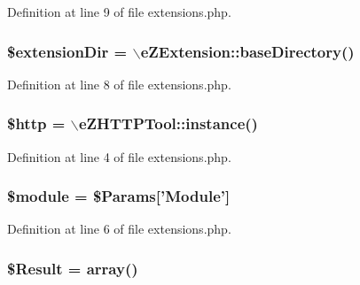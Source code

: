 Definition at line 9 of file extensions.\-php.

\hypertarget{extensions_8php_a511fe73f345235dca8dfab597f398521}{
\subsubsection[{\$extension\-Dir}]{\setlength{\rightskip}{0pt plus 5cm}\$extension\-Dir = $\backslash$e\-Z\-Extension\-::base\-Directory()}}\label{extensions_8php_a511fe73f345235dca8dfab597f398521}


Definition at line 8 of file extensions.\-php.

\hypertarget{extensions_8php_a775fc1707a7fa92aaa1c663c289dbbbc}{
\subsubsection[{\$http}]{\setlength{\rightskip}{0pt plus 5cm}\$http = $\backslash$e\-Z\-H\-T\-T\-P\-Tool\-::instance()}}\label{extensions_8php_a775fc1707a7fa92aaa1c663c289dbbbc}


Definition at line 4 of file extensions.\-php.

\hypertarget{extensions_8php_ac531301c55a8d8b6c7613597218ff482}{
\subsubsection[{\$module}]{\setlength{\rightskip}{0pt plus 5cm}\$module = \$Params\mbox{[}'Module'\mbox{]}}}\label{extensions_8php_ac531301c55a8d8b6c7613597218ff482}


Definition at line 6 of file extensions.\-php.

\hypertarget{extensions_8php_a390d5702f3c15330fd764dbf08d5b2db}{
\subsubsection[{\$\-Result}]{\setlength{\rightskip}{0pt plus 5cm}\$Result = array()}}\label{extensions_8php_a390d5702f3c15330fd764dbf08d5b2db}


